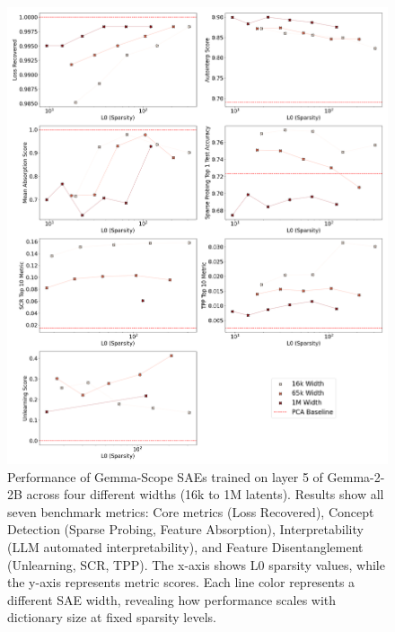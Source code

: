 \documentclass{article}
\theoremstyle{plain}
\theoremstyle{definition}
\theoremstyle{remark}
\begin{document}
\begin{figure}[h!]
\centering
\includegraphics[width=\columnwidth]{images/gemma-scope/plot_2x4_gemma-scope_gemma-2-2b_width_series_layer_5.png}
\caption{Performance of Gemma-Scope SAEs trained on layer 5 of Gemma-2-2B across four different widths (16k to 1M latents). Results show all seven benchmark metrics: Core metrics (Loss Recovered), Concept Detection (Sparse Probing, Feature Absorption), Interpretability (LLM automated interpretability), and Feature Disentanglement (Unlearning, SCR, TPP). The x-axis shows L0 sparsity values, while the y-axis represents metric scores. Each line color represents a different SAE width, revealing how performance scales with dictionary size at fixed sparsity levels.}
\end{figure}
\end{document}
